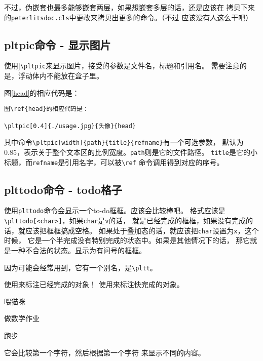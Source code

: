 \documentclass{../src/peterlitsdoc}
\newcommand{\vb}{\verb}
\begin{document}
不过，伪嵌套也最多能够嵌套两层，如果想嵌套多层的话，还是应该在
拷贝下来的\vb|peterlitsdoc.cls|中更改来拷贝出更多的命令。（不过
应该没有人这么干吧）


\subsection{pltpic命令 - 显示图片}

使用]\vb|\pltpic|来显示图片，接受的参数是文件名，标题和引用名。
需要注意的是，浮动体内不能放在盒子里。

图\ref{head}的相应代码是：

\begin{lstlisting}
图\ref{head}的相应代码是：

\pltpic[0.4]{./usage.jpg}{头像}{head}
\end{lstlisting}


其中命令\vb|\pltpic[width]{path}{title}{refname}|有一个可选参数，
默认为0.85，表示关于整个文本区的比例宽度。\vb|path|则是它的文件路径。
\vb|title|是它的小标题，而\vb|refname|是引用名字，可以被\vb|\ref|
命令调用得到对应的序号。



\subsection{plttodo命令 - todo格子}

使用\vb|plttodo|命令会显示一个to-do框框。应该会比较棒吧。
格式应该是\vb|\plttodo[<char>]|，如果\vb|char|是\vb|v|的话，
就是已经完成的框框，如果没有完成的话，就应该把框框搞成空格。
如果处于叠加态的话，就应该把\vb|char|设置为\vb|x|，这个时候，
它是一个半完成没有特别完成的状态中。如果是其他情况下的话，
那它就是一种不合法的状态。显示为有问号的框框。

因为可能会经常用到，它有一个别名，是\vb|\pltt|。

\begin{pltrun}
使用\plttodo[v]来标注已经完成的对象！
使用\plttodo[x]来标注快完成的对象。

\plttodo[v]喂猫咪

\plttodo[x]做数学作业

\plttodo[ ]跑步

它会比较第一个字符，然后根据第一个字符
来显示不同的内容。

\pltt[]   \pltt[x]  \pltt[  ] \pltt[ ]
\pltt[aa] \pltt[ a] \pltt[v]  \pltt[vv]
\pltt[ v]
\end{pltrun}
\end{document}
